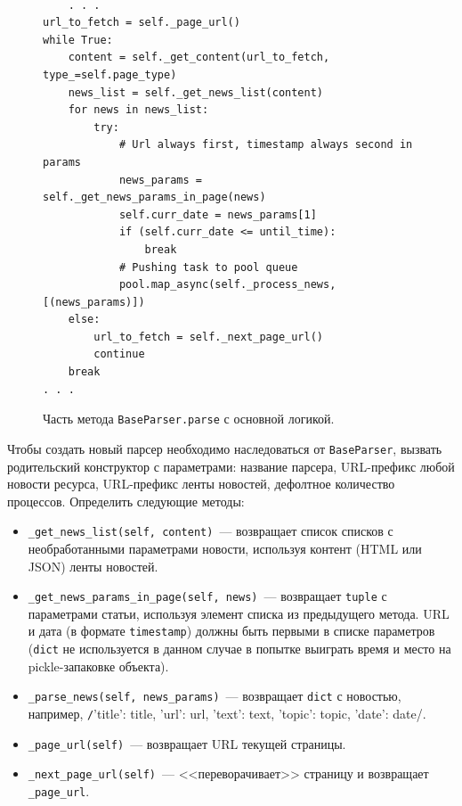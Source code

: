 \documentclass[a4paper, 14pt]{extarticle}
\begin{document}
\begin{figure}
	\centering
	\begin{verbatim}

	. . .
url_to_fetch = self._page_url()
while True:
	content = self._get_content(url_to_fetch, type_=self.page_type)
	news_list = self._get_news_list(content)
    for news in news_list:
        try:
            # Url always first, timestamp always second in params
            news_params = self._get_news_params_in_page(news)
            self.curr_date = news_params[1]
            if (self.curr_date <= until_time):
                break
            # Pushing task to pool queue
            pool.map_async(self._process_news, [(news_params)])
    else:
        url_to_fetch = self._next_page_url()
        continue
    break
. . .
	\end{verbatim}
	\caption{Часть метода \texttt{BaseParser.parse} с основной логикой.}
	\label{parse}
\end{figure}


Чтобы создать новый парсер необходимо наследоваться от \texttt{BaseParser}, вызвать родительский конструктор с параметрами: название парсера, URL-префикс любой новости ресурса, URL-префикс ленты новостей, дефолтное количество процессов. Определить следующие методы:
\begin{itemize}
	\item \texttt{\_get\_news\_list(self, content)}~--- возвращает список списков с необработанными параметрами новости, используя контент (HTML или JSON) ленты новостей.
	\item \texttt{\_get\_news\_params\_in\_page(self, news)}~--- возвращает \texttt{tuple} с параметрами статьи, используя элемент списка из предыдущего метода. URL и дата (в формате \texttt{timestamp}) должны быть первыми в списке параметров (\texttt{dict} не используется в данном случае в попытке выиграть время и место на pickle-запаковке объекта).
	\item \texttt{\_parse\_news(self, news\_params)}~--- возвращает \texttt{dict} с новостью, например, \texttt/{'title': title, 'url': url, 'text': text, 'topic': topic, 'date': date}/.
	\item \texttt{\_page\_url(self)}~--- возвращает URL текущей страницы.
	\item \texttt{\_next\_page\_url(self)}~--- <<переворачивает>> страницу и возвращает \texttt{\_page\_url}.
\end{itemize}
\end{document}
